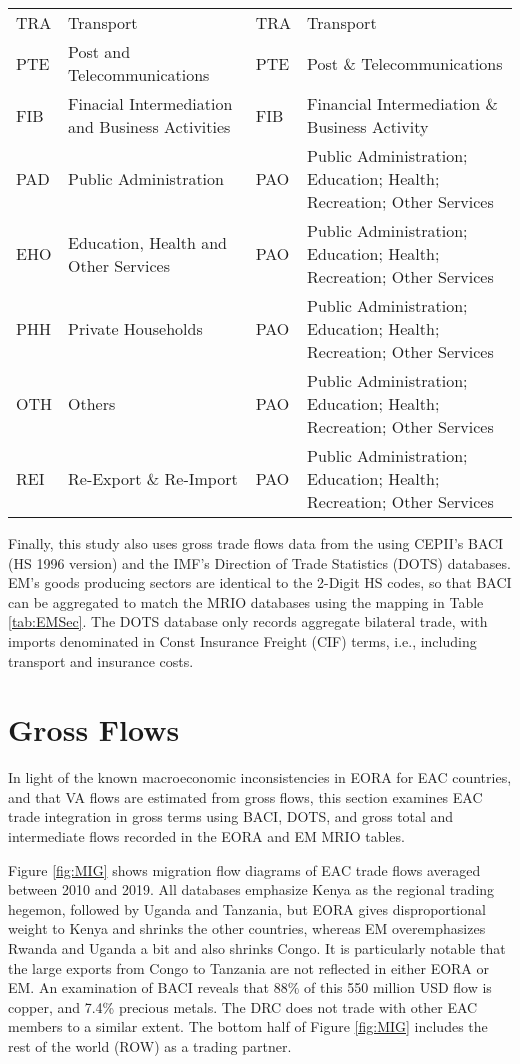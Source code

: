 \documentclass[a4paper]{article}
\begin{document}
\begin{table}[h!]
{\begin{tabular}{llll}
  TRA & Transport & TRA & Transport \\ 
  PTE & Post and Telecommunications & PTE & Post \& Telecommunications \\ 
  FIB & Finacial Intermediation and Business Activities & FIB & Financial Intermediation \& Business Activity \\ 
  PAD & Public Administration & PAO & Public Administration; Education; Health; Recreation; Other Services \\ 
  EHO & Education, Health and Other Services & PAO & Public Administration; Education; Health; Recreation; Other Services \\ 
  PHH & Private Households & PAO & Public Administration; Education; Health; Recreation; Other Services \\ 
  OTH & Others & PAO & Public Administration; Education; Health; Recreation; Other Services \\ 
  REI & Re-Export \& Re-Import & PAO & Public Administration; Education; Health; Recreation; Other Services \\ 
   \bottomrule
\end{tabular}
}
\end{table}
\FloatBarrier

Finally, this study also uses gross trade flows data from the using CEPII's BACI \citep{CEPIIBACI} (HS 1996 version) and the IMF's Direction of Trade Statistics (DOTS) \citep{IMFDOTS} databases. EM's goods producing sectors are identical to the 2-Digit HS codes, so  that BACI can be aggregated to match the MRIO databases using the mapping in Table \ref{tab:EMSec}. The DOTS database only records aggregate bilateral trade, with imports denominated in Const Insurance Freight (CIF) terms, i.e., including transport and insurance costs. 


\newpage


\section{Gross Flows}

In light of the known macroeconomic inconsistencies in EORA for EAC countries, and that VA flows are estimated from gross flows, this section examines EAC trade integration in gross terms using BACI, DOTS, and gross total and intermediate flows recorded in the EORA and EM MRIO tables. \newline

Figure \ref{fig:MIG} shows migration flow diagrams of EAC trade flows averaged between 2010 and 2019. All databases emphasize Kenya as the regional trading hegemon, followed by Uganda and Tanzania, but EORA gives disproportional weight to Kenya and shrinks the other countries, whereas EM overemphasizes Rwanda and Uganda a bit and also shrinks Congo. It is particularly notable that the large exports from Congo to Tanzania are not reflected in either EORA or EM. An examination of BACI reveals that 88\% of this 550 million USD flow is copper, and 7.4\% precious metals. The DRC does not trade with other EAC members to a similar extent. The bottom half of Figure \ref{fig:MIG} includes the rest of the world (ROW) as a trading partner. 
\end{document}
